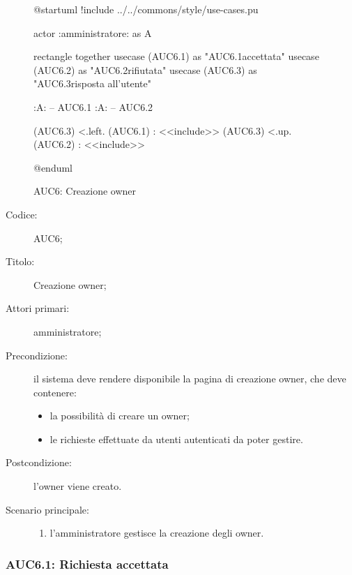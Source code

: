 \documentclass[../../../analisi-dei-requisiti.tex]{subfiles}
\begin{document}
\begin{figure}[H]
  \centering
  \begin{plantuml}
  @startuml
  !include ../../commons/style/use-cases.pu

  actor :amministratore: as A

  rectangle {
    together {
      usecase (AUC6.1) as "AUC6.1\nRichiesta accettata"
      usecase (AUC6.2) as "AUC6.2\nRichiesta rifiutata"
    }
    usecase (AUC6.3) as "AUC6.3\nInvio risposta all'utente"
  }

  :A: -- AUC6.1
  :A: -- AUC6.2

  (AUC6.3) <.left. (AUC6.1) : <<include>>
  (AUC6.3) <.up. (AUC6.2) : <<include>>

  @enduml
  \end{plantuml}
  \caption{AUC6: Creazione owner}%
  \label{fig:AUC6}
\end{figure}

\begin{description}
  \item[Codice:] AUC6;
  \item[Titolo:] Creazione owner;
  \item[Attori primari:] amministratore;
  \item[Precondizione:] il sistema deve rendere disponibile la pagina di creazione owner, che deve contenere:
  \begin{itemize}
    \item la possibilità di creare un owner;
    \item le richieste effettuate da utenti autenticati da poter gestire.
  \end{itemize}
  \item[Postcondizione:] l'owner viene creato.
  \item[Scenario principale:]
  \begin{enumerate}
    \item l'amministratore gestisce la creazione degli owner.
  \end{enumerate}
\end{description}


\subsubsection{AUC6.1: Richiesta accettata}%
\label{subs:AUC6.1}
\end{document}
